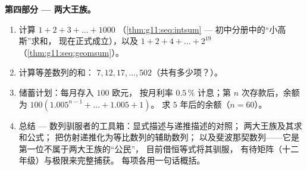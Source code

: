 \begin{problem}
\medskip
\noindent\textbf{第四部分 --- 两大王族。}
\begin{enumerate}[resume]
  \item 计算 $1 + 2 + 3 + \dots + 1000$
        （\cref{thm:g11:seq:intsum} --- 初中分册中的“小高斯”求和，
        现在正式成立），以及
        $1 + 2 + 4 + \dots + 2^{19}$
        （\cref{thm:g11:seq:geomsum}）。
  \item 计算等差数列的和：
        $7, 12, 17, \dots, 502$（共有多少项？）。
  \item 储蓄计划：每月存入 $100$ 欧元，
        按月利率 $0.5\,\%$ 计息；第 $n$ 次存款后，余额为
        $100\left(1.005^{n-1} + \dots + 1.005 + 1\right)$。
        求 $5$ 年后的余额（$n = 60$）。
  \item 总结 --- 数列驯服者的工具箱：显式描述与递推描述的对照；
        两大王族及其求和公式；
        把仿射递推化为等比数列的辅助数列；
        以及斐波那契数列——它是第一位不属于两大王族的“公民”，
        目前借恒等式将其驯服，
        有待矩阵（十二年级）与极限来完整捕获。
        每项各用一句话概括。
\end{enumerate}
\end{problem}
